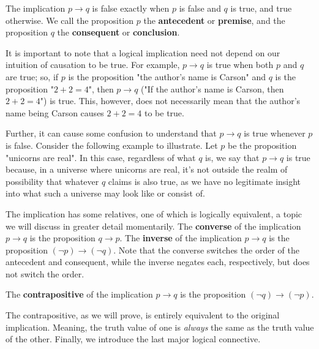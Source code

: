         The implication $p \to q$ is false exactly when $p$ is false and $q$ is true, and true otherwise. We call the proposition $p$ the \textbf{antecedent} or \textbf{premise}, and the proposition $q$ the \textbf{consequent} or \textbf{conclusion}.
        
        It is important to note that a logical implication need not depend on our intuition of causation to be true. For example, $p \to q$ is true when both $p$ and $q$ are true; so, if $p$ is the proposition "the author's name is Carson" and $q$ is the proposition "$2+2=4$", then $p \to q$ ("If the author's name is Carson, then $2+2=4$") is true. This, however, does not necessarily mean that the author's name being Carson causes $2+2=4$ to be true.

        Further, it can cause some confusion to understand that $p \to q$ is true whenever $p$ is false. Consider the following example to illustrate. Let $p$ be the proposition "unicorns are real". In this case, regardless of what $q$ is, we say that $p \to q$ is true because, in a universe where unicorns are real, it's not outside the realm of possibility that whatever $q$ claims is also true, as we have no legitimate insight into what such a universe may look like or consist of.

        The implication has some relatives, one of which is logically equivalent, a topic we will discuss in greater detail momentarily. The \textbf{converse}\label{def:conv} of the implication $p \to q$ is the proposition $q \to p$. The \textbf{inverse}\label{def:inv} of the implication $p \to q$ is the proposition $(\neg p) \to (\neg q)$. Note that the converse switches the order of the antecedent and consequent, while the inverse negates each, respectively, but does not switch the order. 

        \begin{definition}[Contrapositive]\label{def:contrapos}
            The \textbf{contrapositive} of the implication $p \to q$ is the proposition $(\neg q) \to (\neg p)$.
        \end{definition}

        The contrapositive, as we will prove, is entirely equivalent to the original implication. Meaning, the truth value of one is \emph{always} the same as the truth value of the other. Finally, we introduce the last major logical connective.

